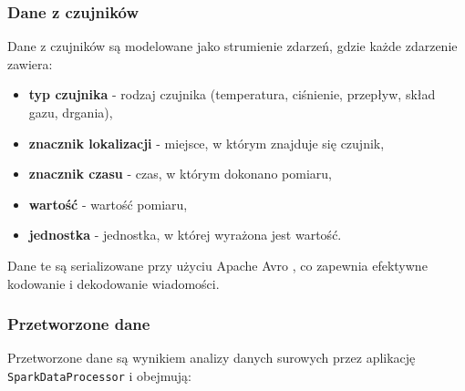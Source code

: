 
\subsubsection{Dane z czujników}
\label{subsubsec:dane_czujnikow}

Dane z czujników są modelowane jako strumienie zdarzeń, gdzie każde zdarzenie zawiera:

\begin{itemize}
    \item \textbf{typ czujnika} - rodzaj czujnika (temperatura, ciśnienie, przepływ, skład gazu, drgania),
    \item \textbf{znacznik lokalizacji} - miejsce, w którym znajduje się czujnik,
    \item \textbf{znacznik czasu} - czas, w którym dokonano pomiaru,
    \item \textbf{wartość} - wartość pomiaru,
    \item \textbf{jednostka} - jednostka, w której wyrażona jest wartość.
\end{itemize}

Dane te są serializowane przy użyciu Apache Avro \cite{avro_documentation}, co zapewnia efektywne kodowanie i dekodowanie wiadomości.

\subsubsection{Przetworzone dane}
\label{subsubsec:przetworzone_dane}

Przetworzone dane są wynikiem analizy danych surowych przez aplikację \texttt{SparkDataProcessor} i obejmują:

